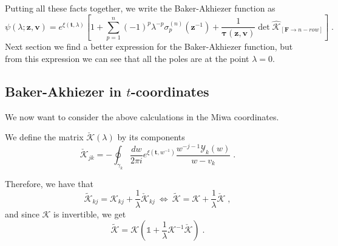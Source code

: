 \documentclass[a4paper,12pt]{amsart}
\begin{document}
Putting all these facts together, we write the Baker-Akhiezer function
as 
\begin{equation}
  \psi(\lambda; \bm{z}, \bm{v}) =
  e^{\xi(\bm{t}, \lambda)}  \left[ 1 + 
  \sum_{p=1}^n (-1)^p \lambda^{-p} \sigma_p^{(n)}(\bm{z}^{-1})
    + \frac{1}{\bm{\tau}(\bm{z}, \bm{v})}
    \det \widehat{\mathcal{K}}_{[\bm{F} \to n-row]}
  \right]\; .
\end{equation}
Next section we find a better expression for the Baker-Akhiezer
function, but from this expression we can see that all the poles
are at the point \(\lambda =0\). 

%


\subsection{Baker-Akhiezer in \(t\)-coordinates}

We now want to consider the above calculations in the Miwa
coordinates. 

We define the matrix \(\check{\mathcal{K}}(\lambda)\) by its components
\begin{equation}
    \check{\mathcal{K}}_{jk} = -
    \oint_{\gamma_k} \frac{dw}{2\pi i}
    e^{\xi(\bm{t}, w^{- 1})} \frac{w^{-j -1 }\mathcal{Y}_k(w)}{w - v_k} \; .
\end{equation}

Therefore, we have that 
\begin{equation}
  \widetilde{\mathcal{K}}_{kj} = 
  \mathcal{K}_{kj}  + \frac{1}{\lambda}
  \check{\mathcal{K}}_{kj}
  \ \Leftrightarrow \
  \widetilde{\mathcal{K}} = 
  \mathcal{K} + \frac{1}{\lambda}
  \check{\mathcal{K}}\; , 
\end{equation}
and since \(\mathcal{K}\) is invertible, we get
\begin{equation}
  \widetilde{\mathcal{K}} = 
  \mathcal{K}\left( \mathbb{1} + 
  \frac{1}{\lambda}\mathcal{K}^{-1}\check{\mathcal{K}} \right)\; .
\end{equation}
\end{document}
